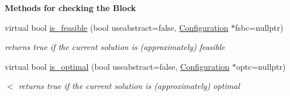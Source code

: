 \begin{Indent}\textbf{ Methods for checking the Block}\par
\begin{DoxyCompactItemize}
\item 
virtual bool \mbox{\hyperlink{class_s_m_spp__di__unipi__it_1_1_block_a4204ffb542117f4ea97eeceeda4da079}{is\+\_\+feasible}} (bool useabstract=false, \mbox{\hyperlink{class_s_m_spp__di__unipi__it_1_1_configuration}{Configuration}} $\ast$fsbc=nullptr)
\begin{DoxyCompactList}\small\item\em returns true if the current solution is (approximately) feasible \end{DoxyCompactList}\item 
virtual bool \mbox{\hyperlink{class_s_m_spp__di__unipi__it_1_1_block_a44ef42401ecae613574f3df619480de1}{is\+\_\+optimal}} (bool useabstract=false, \mbox{\hyperlink{class_s_m_spp__di__unipi__it_1_1_configuration}{Configuration}} $\ast$optc=nullptr)
\begin{DoxyCompactList}\small\item\em $<$ returns true if the current solution is (approximately) optimal \end{DoxyCompactList}\end{DoxyCompactItemize}
\end{Indent}
